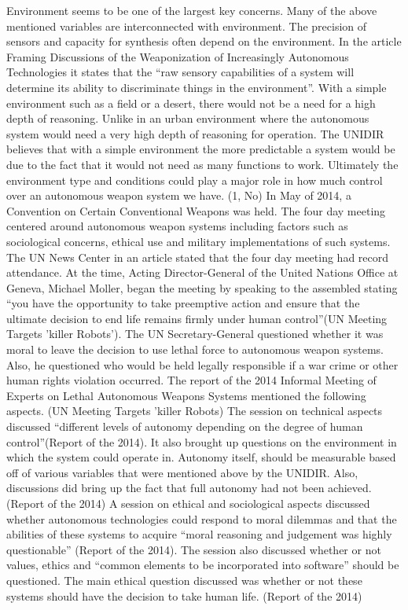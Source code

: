 Environment seems to be one of the largest key concerns. Many of the above mentioned variables are interconnected with environment. The precision of sensors and capacity for synthesis often depend on the environment. In the article Framing Discussions of the Weaponization of Increasingly Autonomous Technologies it states that the “raw sensory capabilities of a system will determine its ability to discriminate things in the environment”. With a simple environment such as a field or a desert, there would not be a need for a high depth of reasoning. Unlike in an urban environment where the autonomous system would need a very high depth of reasoning for operation. The UNIDIR believes that with a simple environment the more predictable a system would be due to the fact that it would not need as many functions to work. Ultimately the environment type and conditions could play a major role in how much control over an autonomous weapon system we have. (1, No)
In May of 2014, a Convention on Certain Conventional Weapons was held. The four day meeting centered around autonomous weapon systems including factors such as sociological concerns, ethical use and military implementations of such systems. The UN News Center in an article stated that the four day meeting had record attendance. At the time, Acting Director-General of the United Nations Office at Geneva, Michael Moller, began the meeting by speaking to the assembled stating “you have the opportunity to take preemptive action and ensure that the ultimate decision to end life remains firmly under human control”(UN Meeting Targets 'killer Robots'). The UN Secretary-General questioned whether it was moral to leave the decision to use lethal force to autonomous weapon systems. Also, he questioned who would be held legally responsible if a war crime or other human rights violation occurred. The report of the 2014 Informal Meeting of Experts on Lethal Autonomous Weapons Systems mentioned the following aspects. (UN Meeting Targets 'killer Robots)
The session on technical aspects discussed “different levels of autonomy depending on the degree of human control”(Report of the 2014). It also brought up questions on the environment in which the system could operate in. Autonomy itself, should be measurable based off of various variables that were mentioned above by the UNIDIR. Also, discussions did bring up the fact that full autonomy had not been achieved.(Report of the 2014)
A session on ethical and sociological aspects discussed whether autonomous technologies could respond to moral dilemmas and that the abilities of these systems to acquire “moral reasoning and judgement was highly questionable” (Report of the 2014). The session also discussed whether or not values, ethics and “common elements to be incorporated into software” should be questioned. The main ethical question discussed was whether or not these systems should have the decision to take human life. (Report of the 2014)
